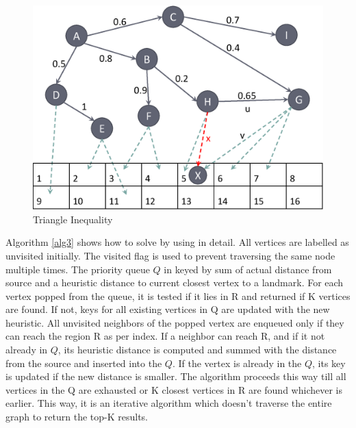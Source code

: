\begin{figure}[t]
    \centering
    \includegraphics[width=0.88\linewidth]{images/triangle_inequality.eps}
    \caption{Triangle Inequality}
    \label{fig:tri-ine}
\end{figure}

Algorithm \ref{alg3} shows how to solve {\query} by using {\rrp} in detail. All vertices are labelled as unvisited initially. The visited flag is used to prevent traversing the same node multiple times. The priority queue $Q$ in keyed by sum of actual distance from source and a heuristic distance to current closest vertex to a landmark. For each vertex popped from the queue, it is tested if it lies in R and returned if K vertices are found. If not, keys for all existing vertices in Q are updated with the new heuristic. All unvisited neighbors of the popped vertex are enqueued only if they can reach the region R as per {\rrpspatial} index. If a neighbor can reach R, and if it not already in $Q$, its heuristic distance is computed and summed with the distance from the source and inserted into the $Q$. If the vertex is already in the $Q$, its key is updated if the new distance is smaller. The algorithm proceeds this way till all vertices in the Q are exhausted or K closest vertices in R are found whichever is earlier. This way, it is an iterative algorithm which doesn't traverse the entire graph to return the top-K results.

		
